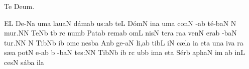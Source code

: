 
\beginhymn Te Deum.

\Internote
{}
\initiumgregorianum
{}%
\sgn {}E{}\punctum L\egn
\spatium
\sgn De-\pes Na\egn
\sgn {}um\punctum a\egn
\spatium
\sgn lau\cephalicus aN\egn
\sgn d{\'a}m\pes ab\egn
\sgn {}u{s:}\punctum a\augmentum b\egn
\spatium
\Asteriscus
\divisiominor
\spatium
\sgn te{}\punctum L\egn
\spatium
\sgn D{\'o}m\punctum N\egn
\sgn {}in\punctum a\egn
\sgn {}um\punctum a\egn
\spatium
\sgn con\punctum N\egn
{}-\pes ab\egn
\sgn t{\'e}-\climacus baN\egn
\custos N
\lineaproxima
\sgn mu{r.}\punctum N\augmentum N\egn
\spatium
\divisiofinalis
\spatium
\sgn Te{}\pes Nb\egn
\spatium
\sgn {}{\ae}t\punctum b\egn
{}r\punctum c\egn
\sgn num\punctum b\egn
\spatium
\sgn Pat\pes ab\egn
\sgn rem\punctum a\augmentum b\egn
\spatium
\divisiominor
\spatium
\sgn {}om\punctum L\egn
\sgn nis\punctum N\egn
\spatium
\sgn ter\punctum a\egn
\sgn ra{}\punctum a\egn
\spatium
\sgn ven\punctum N\egn
\sgn {}er\pes ab\egn
{}-\climacus baN\egn
\sgn tu{r.}\punctum N\augmentum N\egn
\spatium
\divisiofinalis
\spatium
\custos N
\lineaproxima
\sgn Tib\pes Nb\egn
\sgn {}i{}\punctum b\egn
\spatium
\sgn {}om\punctum c\egn
\sgn nes\clivis ba\egn
\spatium
\sgn {}An\punctum b\egn
\sgn ge-\clivis aN\egn
\sgn li,\punctum a\augmentum b\egn
\spatium
\divisiominor
\spatium
\sgn tib\punctum L\egn
\sgn {}i{}\punctum N\egn
\spatium
\sgn c{\ae}l\punctum a\egn
\sgn {}i{}\punctum a\egn
\spatium
\sgn {}et\punctum a\egn
\spatium
\sgn {}un\punctum a\egn
\sgn {}iv\punctum a\egn
{}r\punctum a\egn
\sgn s{\ae}{}\punctum a\egn
\spatium
\sgn pot\punctum N\egn
\sgn {}e-\pes ab\egn
\custos b
\lineaproxima
{}-\climacus baN\egn
\sgn te{s:}\punctum N\augmentum N\egn
\spatium
\divisiofinalis
\spatium
\sgn Tib\pes Nb\egn
\sgn {}i{}\punctum b\egn
\spatium
{}r\punctum c\egn
\sgn {}ub\punctum b\egn
\sgn {}im\punctum a\egn
\spatium
\sgn {}et\punctum a\egn
\spatium
\sgn S{\'e}r\punctum b\egn
\sgn {}a{ph}\clivis aN\egn
\sgn {}im%
\punctum a\augmentum b\egn
\spatium
\divisiominor
\spatium
\sgn {}in\punctum L\egn
\sgn ces\punctum N\egn
\sgn s{\'a}b\punctum a\egn
\sgn {}il\punctum a\egn
